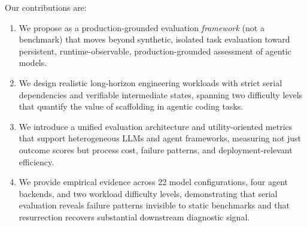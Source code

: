 Our contributions are:
\begin{enumerate}[nosep]
\item We propose \eva{} as a production-grounded evaluation \emph{framework} (not a benchmark) that moves beyond synthetic, isolated task evaluation toward persistent, runtime-observable, production-grounded assessment of agentic models.
\item We design realistic long-horizon engineering workloads with strict serial dependencies and verifiable intermediate states, spanning two difficulty levels that quantify the value of scaffolding in agentic coding tasks.
\item We introduce a unified evaluation architecture and utility-oriented metrics that support heterogeneous LLMs and agent frameworks, measuring not just outcome scores but process cost, failure patterns, and deployment-relevant efficiency.
\item We provide empirical evidence across 22 model configurations, four agent backends, and two workload difficulty levels, demonstrating that serial evaluation reveals failure patterns invisible to static benchmarks and that resurrection recovers substantial downstream diagnostic signal.
\end{enumerate}